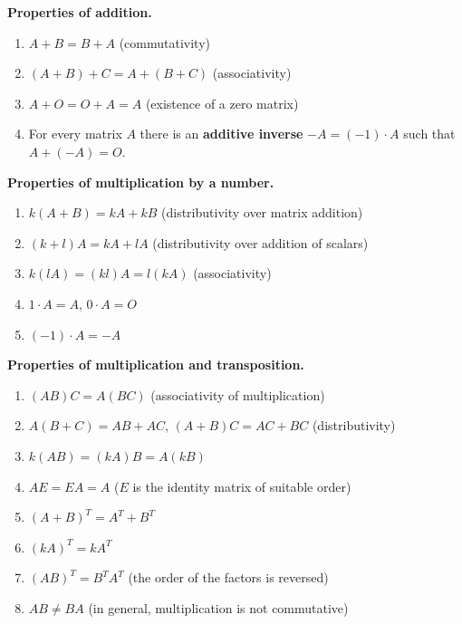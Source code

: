 \textbf{Properties of addition.}
\begin{enumerate}[label=\arabic*)]
\item $A+B=B+A$ \hfill (commutativity)
\item $(A+B)+C=A+(B+C)$ \hfill (associativity)
\item $A+O=O+A=A$ \hfill (existence of a zero matrix)
\item For every matrix $A$ there is an \textbf{additive inverse} $-A=(-1)\cdot A$
such that $A+(-A)=O$.
\end{enumerate}
\textbf{Properties of multiplication by a number.}
\begin{enumerate}[label=\arabic*)]
\item $k(A+B)=kA+kB$ \hfill (distributivity over matrix addition)
\item $(k+l)A=kA+lA$ \hfill (distributivity over addition of scalars)
\item $k(lA)=(kl)A=l(kA)$ \hfill (associativity)
\item $1\cdot A=A$, \quad $0\cdot A=O$
\item $(-1)\cdot A=-A$
\end{enumerate}
\textbf{Properties of multiplication and transposition.}
\begin{enumerate}[label=\arabic*)]
\item $(AB)C=A(BC)$ \hfill (associativity of multiplication)
\item $A(B+C)=AB+AC$, \quad $(A+B)C=AC+BC$ \hfill (distributivity)
\item $k(AB)=(kA)B=A(kB)$
\item $AE=EA=A$ \hfill ($E$ is the identity matrix of suitable order)
\item $(A+B)^{T}=A^{T}+B^{T}$
\item $(kA)^{T}=kA^{T}$
\item $(AB)^{T}=B^{T}A^{T}$ \hfill (the order of the factors is reversed)
\item $AB\neq BA$ \hfill (in general, multiplication is not commutative)
\end{enumerate}
\vspace{3pt}
